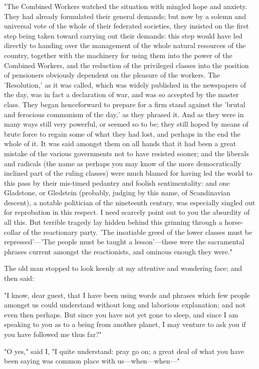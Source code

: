 "The Combined Workers watched the situation with mingled hope and
anxiety. They had already formulated their general demands; but now by a
solemn and universal vote of the whole of their federated societies,
they insisted on the first step being taken toward carrying out their
demands: this step would have led directly to handing over the
management of the whole natural resources of the country, together with
the machinery for using them into the power of the Combined Workers, and
the reduction of the privileged classes into the position of pensioners
obviously dependent on the pleasure of the workers. The 'Resolution,' as
it was called, which was widely published in the newspapers of the day,
was in fact a declaration of war, and was so accepted by the master
class. They began henceforward to prepare for a firm stand against the
'brutal and ferocious communism of the day,' as they phrased it. And as
they were in many ways still very powerful, or seemed so to be; they
still hoped by means of brute force to regain some of what they had
lost, and perhaps in the end the whole of it. It was said amongst them
on all hands that it had been a great mistake of the various governments
not to have resisted sooner; and the liberals and radicals (the name as
perhaps you may know of the more democratically inclined part of the
ruling classes) were much blamed for having led the world to this pass
by their mis-timed pedantry and foolish sentimentality: and one
Gladstone, or Gledstein (probably, judging by this name, of Scandinavian
descent), a notable politician of the nineteenth century, was especially
singled out for reprobation in this respect. I need scarcely point out
to you the absurdity of all this. But terrible tragedy lay hidden behind
this grinning through a horse-collar of the reactionary party. 'The
insatiable greed of the lower classes must be repressed'---'The people
must be taught a lesson'---these were the sacramental phrases current
amongst the reactionists, and ominous enough they were."

The old man stopped to look keenly at my attentive and wondering face;
and then said:

"I know, dear guest, that I have been using words and phrases which few
people amongst us could understand without long and laborious
explanation; and not even then perhaps. But since you have not yet gone
to sleep, and since I am speaking to you as to a being from another
planet, I may venture to ask you if you have followed me thus far?"

"O yes," said I, "I quite understand: pray go on; a great deal of what
you have been saying was common place with us---when---when---"

